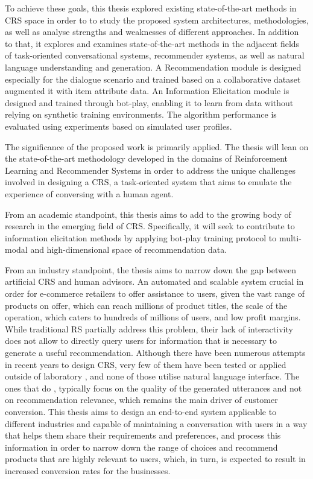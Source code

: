 To achieve these goals, this thesis explored existing state-of-the-art methods in CRS space in order to to study the proposed system architectures, methodologies, as well as analyse strengths and weaknesses of different approaches. In addition to that, it explores and examines state-of-the-art methods in the adjacent fields of task-oriented conversational systems, recommender systems, as well as natural language understanding and generation. A Recommendation module is designed especially for the dialogue scenario and trained based on a collaborative dataset augmented it with item attribute data. An Information Elicitation module is designed and trained through bot-play, enabling it to learn from data without relying on synthetic training environments. The algorithm performance is evaluated using experiments based on simulated user profiles.

The significance of the proposed work is primarily applied. The thesis will lean on the state-of-the-art methodology developed in the domains of Reinforcement Learning and Recommender Systems in order to address the unique challenges involved in designing a CRS, a task-oriented system that aims to emulate the experience of conversing with a human agent. 

From an academic standpoint, this thesis aims to add to the growing body of research in the emerging field of CRS. Specifically, it will seek to contribute to information elicitation methods by applying bot-play training protocol to multi-modal and high-dimensional space of recommendation data. 

From an industry standpoint, the thesis aims to narrow down the gap between artificial CRS and human advisors. An automated and scalable system crucial in order for e-commerce retailers to offer assistance to users, given the vast range of products on offer, which can reach millions of product titles, the scale of the operation, which caters to hundreds of millions of users, and low profit margins. While traditional RS partially address this problem, their lack of interactivity does not allow to directly query users for information that is necessary to generate a useful recommendation. Although there have been numerous attempts in recent years to design CRS, very few of them have been tested or applied outside of laboratory \citep{mahmood2009improving}, and none of those utilise natural language interface. The ones that do \citep{li2018towards, kang2019recommendation}, typically focus on the quality of the generated utterances and not on recommendation relevance, which remains the main driver of customer conversion. This thesis aims to design an end-to-end system applicable to different industries and capable of maintaining a conversation with users in a way that helps them share their requirements and preferences, and process this information in order to narrow down the range of choices and recommend products that are highly relevant to users, which, in turn, is expected to result in increased conversion rates for the businesses. 

